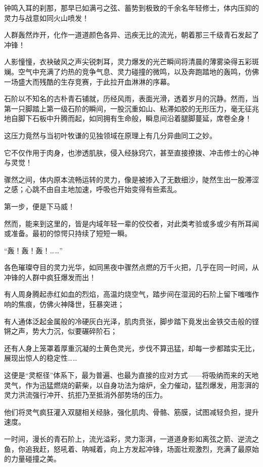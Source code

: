钟鸣入耳的刹那，那早已如满弓之弦、蓄势到极致的千余名年轻修士，体内压抑的灵力与战意如同火山喷发！

人群轰然炸开，化作一道道颜色各异、迅疾无比的流光，朝着那三千级青石发起了冲锋！

人影憧憧，衣袂破风之声尖锐刺耳，灵力爆发的光芒瞬间将清晨的薄雾染得五彩斑斓。空气中充满了灼热的竞争气息、灵力碰撞的微鸣，以及奔跑踏地的轰鸣，仿佛一场盛大而残酷的生存竞赛，于此拉开血淋淋的序幕。

石阶以不知名的古朴青石铺就，历经风雨，表面光滑，透着岁月的沉静。然而，当第一只脚踏上第一级石阶的瞬间，一股沉重如山、粘滞如胶的无形压力，毫无征兆地自脚下石板中升腾而起，如同拥有生命般，瞬息间沿着腿脚蔓延，席卷全身！

这压力竟然与当初叶牧谦的见独领域在原理上有几分异曲同工之妙。

它不仅作用于肉身，也渗透肌肤，侵入经脉窍穴，甚至直接撩拨、冲击修士的心神与灵觉！

骤然之间，体内原本流畅运转的灵力，像是被掺入了无数细沙，陡然生出一股滞涩之感；心跳不由自主地加速，呼吸也开始变得有些紊乱。

第一步，便是下马威！

然而，能来到这里的，皆是内域年轻一辈的佼佼者，对此类考验或多或少有所耳闻或准备。最初的惊愕只持续了短短一瞬。

“轰！轰！轰！……”

各色璀璨夺目的灵力光华，如同黑夜中骤然点燃的万千火把，几乎在同一时间，从冲锋的人群中疯狂爆发而出！

有人周身腾起赤红如血的烈焰，高温灼烧空气，踏步间在湿润的石阶上留下嗤嗤作响的焦痕，仿佛火神降世，狂暴突进；

有人通体泛起金属般的冷硬灰白光泽，肌肉贲张，脚步踏下竟发出金铁交击般的铿锵之声，势大力沉，似要碾碎阶石；

还有人身上笼罩着厚重沉凝的土黄色灵光，步伐不算迅猛，却每一步都踏实无比，展现出惊人的稳定性……

这便是“灵枢径”体系下，最为普遍、也最为直接的应对方式——将吸纳而来的天地灵气，作为迅猛燃烧的薪柴，以自身功法为熔炉，全力催动，猛烈爆发，用澎湃的灵力洪流强行冲开、抗拒乃至抵消外部势场的压力。

他们将灵气疯狂灌入双腿相关经脉，强化肌肉、骨骼、筋膜，试图减轻负担，提升速度。

一时间，漫长的青石阶上，流光溢彩，灵力澎湃，一道道身影如离弦之箭、逆流之鱼，你追我赶，怒吼着、呐喊着，向上方发起冲锋，场面壮观激烈，充满了最原始的力量碰撞之美。

\vspace{2em}

